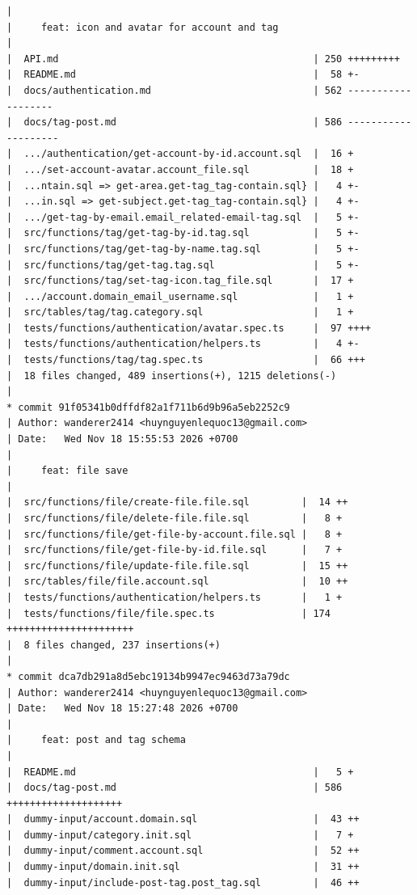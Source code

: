 \documentclass[12pt]{article}
\begin{document}
\begin{lstlisting}[numbers=none,breaklines=true]
|
|     feat: icon and avatar for account and tag
|
|  API.md                                            | 250 +++++++++
|  README.md                                         |  58 +-
|  docs/authentication.md                            | 562 -------------------
|  docs/tag-post.md                                  | 586 --------------------
|  .../authentication/get-account-by-id.account.sql  |  16 +
|  .../set-account-avatar.account_file.sql           |  18 +
|  ...ntain.sql => get-area.get-tag_tag-contain.sql} |   4 +-
|  ...in.sql => get-subject.get-tag_tag-contain.sql} |   4 +-
|  .../get-tag-by-email.email_related-email-tag.sql  |   5 +-
|  src/functions/tag/get-tag-by-id.tag.sql           |   5 +-
|  src/functions/tag/get-tag-by-name.tag.sql         |   5 +-
|  src/functions/tag/get-tag.tag.sql                 |   5 +-
|  src/functions/tag/set-tag-icon.tag_file.sql       |  17 +
|  .../account.domain_email_username.sql             |   1 +
|  src/tables/tag/tag.category.sql                   |   1 +
|  tests/functions/authentication/avatar.spec.ts     |  97 ++++
|  tests/functions/authentication/helpers.ts         |   4 +-
|  tests/functions/tag/tag.spec.ts                   |  66 +++
|  18 files changed, 489 insertions(+), 1215 deletions(-)
|
* commit 91f05341b0dffdf82a1f711b6d9b96a5eb2252c9
| Author: wanderer2414 <huynguyenlequoc13@gmail.com>
| Date:   Wed Nov 18 15:55:53 2026 +0700
|
|     feat: file save
|
|  src/functions/file/create-file.file.sql         |  14 ++
|  src/functions/file/delete-file.file.sql         |   8 +
|  src/functions/file/get-file-by-account.file.sql |   8 +
|  src/functions/file/get-file-by-id.file.sql      |   7 +
|  src/functions/file/update-file.file.sql         |  15 ++
|  src/tables/file/file.account.sql                |  10 ++
|  tests/functions/authentication/helpers.ts       |   1 +
|  tests/functions/file/file.spec.ts               | 174 ++++++++++++++++++++++
|  8 files changed, 237 insertions(+)
|
* commit dca7db291a8d5ebc19134b9947ec9463d73a79dc
| Author: wanderer2414 <huynguyenlequoc13@gmail.com>
| Date:   Wed Nov 18 15:27:48 2026 +0700
|
|     feat: post and tag schema
|
|  README.md                                         |   5 +
|  docs/tag-post.md                                  | 586 ++++++++++++++++++++
|  dummy-input/account.domain.sql                    |  43 ++
|  dummy-input/category.init.sql                     |   7 +
|  dummy-input/comment.account.sql                   |  52 ++
|  dummy-input/domain.init.sql                       |  31 ++
|  dummy-input/include-post-tag.post_tag.sql         |  46 ++

\end{lstlisting}
\end{document}
